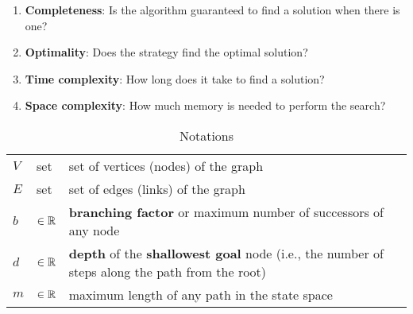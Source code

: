 \begin{enumerate}
    \item \textbf{Completeness}: Is the algorithm guaranteed to find a solution when there is one?
    \hfill \cite{ai/book/Artificial-Intelligence-A-Modern-Approach/Russell-Norvig}

    \item \textbf{Optimality}: Does the strategy find the optimal solution?
    \hfill \cite{ai/book/Artificial-Intelligence-A-Modern-Approach/Russell-Norvig}

    \item \textbf{Time complexity}: How long does it take to find a solution?
    \hfill \cite{ai/book/Artificial-Intelligence-A-Modern-Approach/Russell-Norvig}

    \item \textbf{Space complexity}: How much memory is needed to perform the search?
    \hfill \cite{ai/book/Artificial-Intelligence-A-Modern-Approach/Russell-Norvig}
\end{enumerate}


\vspace{0.5cm}

\begin{customArrayStretch}{1.3}
\begin{table}[H]
\centering
\begin{tabular}{l l p{12cm}}

$V$ & set & set of vertices (nodes) of the graph \\

$E$ & set & set of edges (links) of the graph \\

$b$ & $\in \mathbb{R}$ & \textbf{branching factor} or maximum number of successors of any node \\

$d$ & $\in \mathbb{R}$ & \textbf{depth} of the \textbf{shallowest goal} node (i.e., the number of steps along the path from the root) \\

$m$ & $\in \mathbb{R}$ & maximum length of any path in the state space \\

\end{tabular}
\caption*{Notations}
\end{table}
\end{customArrayStretch}


